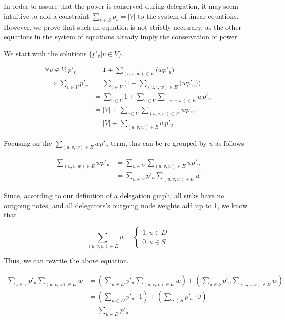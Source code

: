 In order to assure that the power is conserved during delegation, it may seem intuitive to add a constraint $\sum_{s \in S} p_s = |V|$ to the system of linear equations. However, we prove that such an equation is not strictly necessary, as the other equations in the system of equations already imply the conservation of power.

We start with the solutions $\{p'_v | v \in V\}$.

\begin{align*}
\forall v \in V: p'_v &= 1+\sum_{(u, v, w) \in E} \bigl(wp'_u \bigr) \\
\implies \sum_{v \in V} p'_v &= \sum_{v \in V} \bigl( 1 + \sum_{(u, v, w) \in E} \bigl( wp'_u \bigr ) \bigr) \\
&= \sum_{v \in V} 1 + \sum_{v \in V} \sum_{(u, v, w) \in E} wp'_u \\
&= |V| + \sum_{v \in V} \sum_{(u, v, w) \in E} wp'_u \\
&= |V| + \sum_{(u, v, w) \in E} wp'_u
\end{align*}

Focusing on the $\sum_{(u, v, w) \in E} wp'_u$ term, this can be re-grouped by $u$ as follows 

\begin{align*}
\sum_{(u, v, w) \in E} wp'_u &= \sum_{u \in V} \sum_{(u, v, w) \in E} wp'_u \\
&= \sum_{u \in V} p'_u  \sum_{(u, v, w) \in E} w
\end{align*}

Since, according to our definition of a delegation graph, all sinks have no outgoing notes, and all delegators's outgoing node weights add up to 1, we know that

\[
\sum_{(u, v, w) \in E} w = \begin{cases} 1, u \in D \\ 0, u \in S \end{cases}
\]

Thus, we can rewrite the above equation.

\begin{align*}
\sum_{u \in V} p'_u  \sum_{(u, v, w) \in E} w &= \left(\sum_{u \in D} p'_u  \sum_{(u, v, w) \in E} w \right) + \left( \sum_{u \in S} p'_u  \sum_{(u, v, w) \in E} w \right) \\
&= \left( \sum_{u \in D} p'_u \cdot 1 \right) + \left(\sum_{u \in S} p'_u \cdot 0 \right) \\
&= \sum_{u \in D} p'_u
\end{align*}

